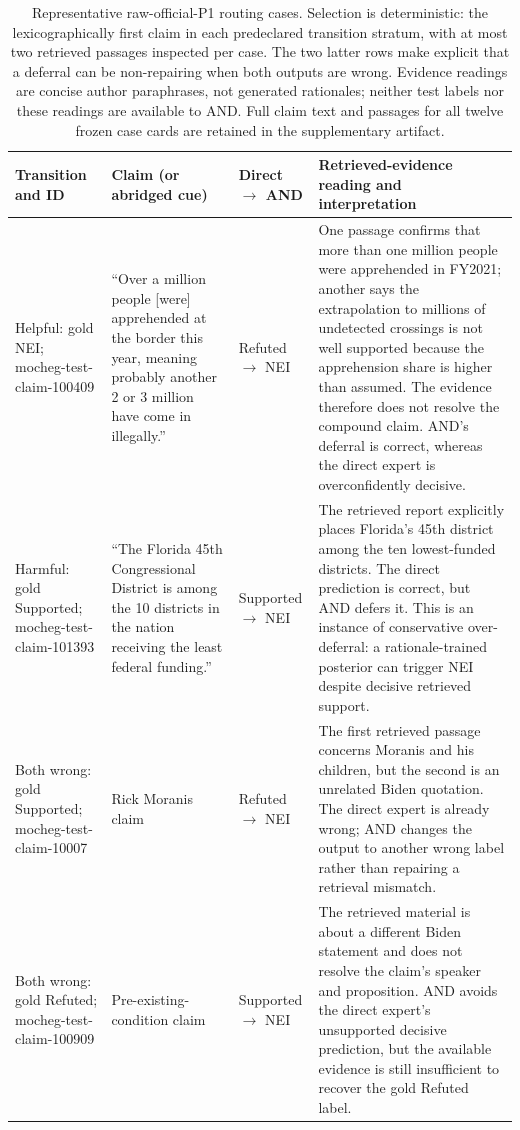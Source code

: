 \documentclass[11pt]{article}
\begin{document}
\begin{table}[t]
\centering\small
\begin{tabular}{@{}p{}p{}p{}p{}@{}}
\toprule
Transition and ID & Claim (or abridged cue) & Direct $\rightarrow$ AND & Retrieved-evidence reading and interpretation\\
\midrule
Helpful: gold \textsc{NEI}; \newline mocheg-test-claim-100409 &
``Over a million people [were] apprehended at the border this year, meaning probably another 2 or 3 million have come in illegally.'' &
Refuted $\rightarrow$ \textsc{NEI} &
One passage confirms that more than one million people were apprehended in FY2021; another says the extrapolation to millions of undetected crossings is not well supported because the apprehension share is higher than assumed. The evidence therefore does not resolve the compound claim. AND's deferral is correct, whereas the direct expert is overconfidently decisive.\\
\addlinespace
Harmful: gold Supported; \newline mocheg-test-claim-101393 &
``The Florida 45th Congressional District is among the 10 districts in the nation receiving the least federal funding.'' &
Supported $\rightarrow$ \textsc{NEI} &
The retrieved report explicitly places Florida's 45th district among the ten lowest-funded districts. The direct prediction is correct, but AND defers it. This is an instance of conservative over-deferral: a rationale-trained posterior can trigger \textsc{NEI} despite decisive retrieved support.\\
\addlinespace
Both wrong: gold Supported; \newline mocheg-test-claim-10007 &
Rick Moranis claim &
Refuted $\rightarrow$ \textsc{NEI} &
The first retrieved passage concerns Moranis and his children, but the second is an unrelated Biden quotation. The direct expert is already wrong; AND changes the output to another wrong label rather than repairing a retrieval mismatch.\\
\addlinespace
Both wrong: gold Refuted; \newline mocheg-test-claim-100909 &
Pre-existing-condition claim &
Supported $\rightarrow$ \textsc{NEI} &
The retrieved material is about a different Biden statement and does not resolve the claim's speaker and proposition. AND avoids the direct expert's unsupported decisive prediction, but the available evidence is still insufficient to recover the gold Refuted label.\\
\bottomrule
\end{tabular}
\caption{Representative raw-official-P1 routing cases. Selection is deterministic: the lexicographically first claim in each predeclared transition stratum, with at most two retrieved passages inspected per case. The two latter rows make explicit that a deferral can be non-repairing when both outputs are wrong. Evidence readings are concise author paraphrases, not generated rationales; neither test labels nor these readings are available to AND. Full claim text and passages for all twelve frozen case cards are retained in the supplementary artifact.}\label{tab:qualitative-cases}
\end{table}
\end{document}
